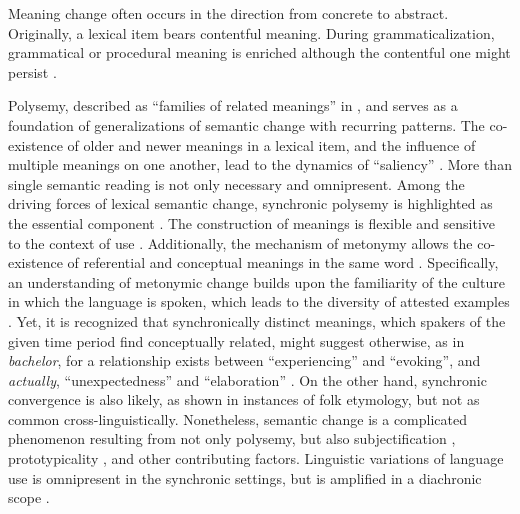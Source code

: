 
Meaning change often occurs in the direction from concrete to abstract. Originally, a lexical item bears contentful meaning. During grammaticalization, grammatical or procedural meaning is enriched although the contentful one might persist \parencite[81]{traugott2001regularity}.

Polysemy, described as ``families of related meanings'' in \textcite[11]{traugott2001regularity}, and serves as a foundation of generalizations of semantic change with recurring patterns. The co-existence of older and newer meanings in a lexical item, and the influence of multiple meanings on one another, lead to the dynamics of ``saliency'' \textcite[12]{traugott2001regularity}. More than single semantic reading is not only necessary and omnipresent. Among the driving forces of lexical semantic change, synchronic polysemy is highlighted as the essential component \parencite{robertinvanhove2008}. The construction of meanings is flexible and sensitive to the context of use \parencite{miller1991contextual,harris1954distributional}. Additionally, the mechanism of metonymy allows the co-existence of referential and conceptual meanings in the same word \parencite{hilpert2019historical,nerlich2001serial}. Specifically, an understanding of metonymic change builds upon the familiarity of the culture in which the language is spoken, which leads to the diversity of attested examples \parencite[649]{fortson2017approach}. Yet, it is recognized that synchronically distinct meanings, which spakers of the given time period find conceptually related, might suggest otherwise, as in \textit{bachelor}, for a relationship exists between ``experiencing'' and ``evoking'', and \textit{actually}, ``unexpectedness'' and ``elaboration'' \textcite[13]{traugott2001regularity}. On the other hand, synchronic convergence is also likely, as shown in instances of folk etymology, but not as common cross-linguistically. Nonetheless, semantic change is a complicated phenomenon resulting from not only polysemy, but also subjectification \parencite{traugott2001regularity}, prototypicality \parencite{geeraerts1997diachronic}, and other contributing factors. Linguistic variations of language use is omnipresent in the synchronic settings, but is amplified in a diachronic scope \parencite{semanticincrowley2010,bowern2019semantic}.

